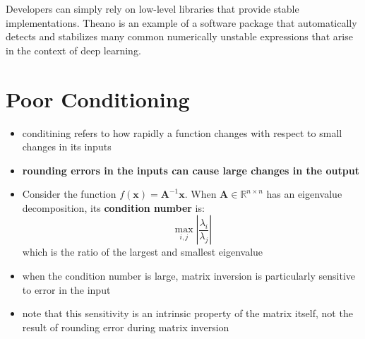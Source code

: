 \documentclass[11pt, twocolumn]{report}
\def\realnumbers{\mathbb{R}}
\begin{document}
Developers can simply rely on low-level libraries that provide stable
implementations.  Theano is an example of a software package that automatically
detects and stabilizes many common numerically unstable expressions that arise
in the context of deep learning.

\section{Poor Conditioning}
\begin{itemize}
  \item conditining refers to how rapidly a function changes with respect to
    small changes in its inputs
  \item \textbf{rounding errors in the inputs can cause large changes in the
      output}
  \item Consider the function $f(\bm{x}) = \bm{A}^{-1}\bm{x}$. When $\bm{A} \in
    \realnumbers^{n \times n}$ has an eigenvalue decomposition, its
    \textbf{condition number} is:
    \begin{equation}
      \max_{i, j} \left|\frac{\lambda_i}{\lambda_j}\right|
    \end{equation}
    which is the ratio of the largest and smallest eigenvalue
    \item when the condition number is large, matrix inversion is particularly
      sensitive to error in the input
    \item note that this sensitivity is an intrinsic property of the matrix
      itself, not the result of rounding error during matrix inversion
\end{itemize}
\end{document}
